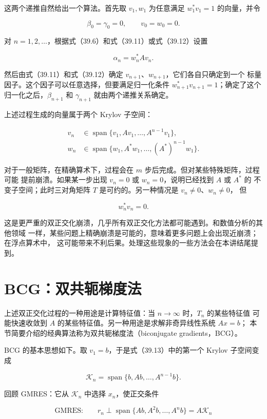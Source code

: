 \documentclass[UTF8,fontset=none,12pt]{ctexart}
\begin{document}
这两个递推自然给出一个算法。首先取 $v_1,w_1$ 为任意满足
$w_1^*v_1=1$ 的向量，并令

\[
\beta_0=\gamma_0=0,\qquad v_0=w_0=0.
\]

对 $n=1,2,\ldots$，根据式（39.6）和式（39.11）或式（39.12）设置

\[
\alpha_n=w_n^*Av_n.
\]

然后由式（39.11）和式（39.12）确定 $v_{n+1}$、$w_{n+1}$，它们各自只确定到一个
标量因子。这个因子可以任意选择，但要满足归一化条件
$w_{n+1}^*v_{n+1}=1$；确定了这个归一化之后，$\beta_{n+1}$ 和 $\gamma_{n+1}$
就由两个递推关系确定。

上述过程生成的向量属于两个 Krylov 子空间：

\begin{align}
v_n&\in\operatorname{span}\{v_1,Av_1,\ldots,A^{n-1}v_1\},\nonumber\\
w_n&\in\operatorname{span}\{w_1,A^*w_1,\ldots,(A^*)^{n-1}w_1\}.
\tag{39.13}
\end{align}

对于一般矩阵，在精确算术下，过程会在 $m$ 步后完成。但对某些特殊矩阵，过程可能
提前崩溃。如果某一步出现 $v_n=0$ 或 $w_n=0$，说明已经找到 $A$ 或 $A^*$ 的
不变子空间；此时三对角矩阵 $T$ 是可约的。另一种情况是 $v_n\ne0$、$w_n\ne0$，
但

\[
w_n^*v_n=0.
\]

这是更严重的双正交化崩溃，几乎所有双正交化方法都可能遇到。和数值分析的其他领域
一样，某些问题上精确崩溃是可能的，意味着更多问题上会出现近崩溃；在浮点算术中，
这可能带来不利后果。处理这些现象的一些方法会在本讲结尾提到。

\section*{BCG：双共轭梯度法}

上述双正交化过程的一种用途是计算特征值：当 $n\to\infty$ 时，$T_n$ 的某些特征值
可能快速收敛到 $A$ 的某些特征值。另一种用途是求解非奇异线性系统 $Ax=b$；
本节简要介绍的经典算法称为双共轭梯度法（biconjugate gradients，BCG）。

BCG 的基本思想如下。取 $v_1=b$，于是式（39.13）中的第一个 Krylov 子空间变成

\[
\mathcal K_n=\operatorname{span}\{b,Ab,\ldots,A^{n-1}b\}.
\]

回顾 GMRES：它从 $\mathcal K_n$ 中选择 $x_n$，使正交条件

\begin{equation}
\text{GMRES:}\qquad
r_n\perp\operatorname{span}\{Ab,A^2b,\ldots,A^nb\}
=A\mathcal K_n
\tag{39.14}
\end{equation}
\end{document}
